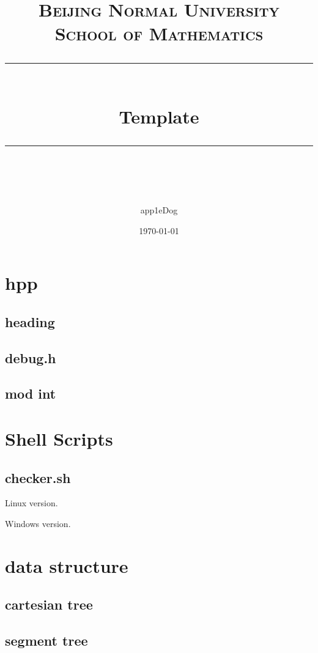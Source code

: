\documentclass[UTF8, a4paper, titlepage, twoside]{ctexart}
\title{	
	\normalfont\normalsize
	\textsc{Beijing Normal University \\ School of Mathematics}\\ 
	\vspace{25pt} 
	\rule{\linewidth}{0.5pt}\\ 
	\vspace{20pt} 
	{\Huge Template}\\ 
	\vspace{12pt} 
	\rule{\linewidth}{2pt}\\ 
	\vspace{12pt} 
}
\author{\LARGE app1eDog}
\date{\normalsize\today}
\begin{document}
\maketitle

\tableofcontents

\newpage
\section{ hpp }
\subsection{ heading }


\subsection{ debug.h }


\subsection { mod int }


\newpage
\section{ Shell Scripts }

\subsection{ checker.sh }

Linux version.


Windows version.


\section{data structure}
\subsection{cartesian tree}

\subsection{segment tree}




\end{document}
